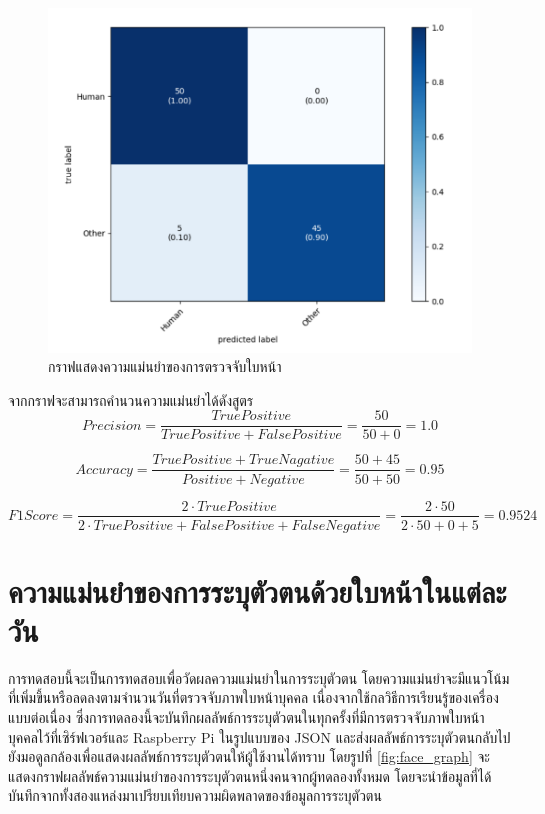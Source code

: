 \begin{figure}[!ht]
  \begin{center}
    \includegraphics[scale=.55]{pic/face_result.png}
    \caption[กราฟแสดงความแม่นยำของการตรวจจับใบหน้า]{กราฟแสดงความแม่นยำของการตรวจจับใบหน้า}
    \label{fig:acc_graph}
  \end{center}
\end{figure}
\newpage
\indent จากกราฟจะสามารถคำนวนความแม่นยำได้ดังสูตร 
\begin{equation}\label{eq:Precision}
Precision=\frac{True Positive}{True Positive + False Positive}=\frac{50}{50+0} = 1.0
\end{equation}

\begin{equation}\label{eq:Accuracy}
Accuracy=\frac{True Positive + True Nagative}{Positive + Negative}=\frac{50+45}{50+50} = 0.95
\end{equation}

\begin{equation}\label{eq:F1Score}
F1 Score=\frac{2\cdot True Positive}{2\cdot True Positive + False Positive + False Negative}=\frac{2\cdot 50}{2\cdot 50+0+5} = 0.9524
\end{equation}

\section{ความแม่นยำของการระบุตัวตนด้วยใบหน้าในแต่ละวัน}
การทดสอบนี้จะเป็นการทดสอบเพื่อวัดผลความแม่นยำในการระบุตัวตน โดยความแม่นยำจะมีแนวโน้มที่เพิ่มขึ้นหรือลดลงตามจำนวนวันที่ตรวจจับภาพใบหน้าบุคคล
เนื่องจากใช้กลวิธีการเรียนรู้ของเครื่องแบบต่อเนื่อง ซึ่งการทดลองนี้จะบันทึกผลลัพธ์การระบุตัวตนในทุกครั้งที่มีการตรวจจับภาพใบหน้าบุคคลไว้ที่เซิร์ฟเวอร์และ Raspberry Pi 
ในรูปแบบของ JSON และส่งผลลัพธ์การระบุตัวตนกลับไปยังมอดูลกล้องเพื่อแสดงผลลัพธ์การระบุตัวตนให้ผู้ใช้งานได้ทราบ 
โดยรูปที่ \ref*{fig:face_graph} จะแสดงกราฟผลลัพธ์ความแม่นยำของการระบุตัวตนหนึ่งคนจากผู้ทดลองทั้งหมด 
โดยจะนำข้อมูลที่ได้บันทึกจากทั้งสองแหล่งมาเปรียบเทียบความผิดพลาดของข้อมูลการระบุตัวตน


